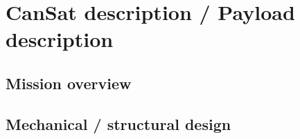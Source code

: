 \documentclass[11pt]{article}
\begin{document}
\section{CanSat description / Payload description}

\subsection{Mission overview}

\subsection{Mechanical / structural design}
\end{document}
